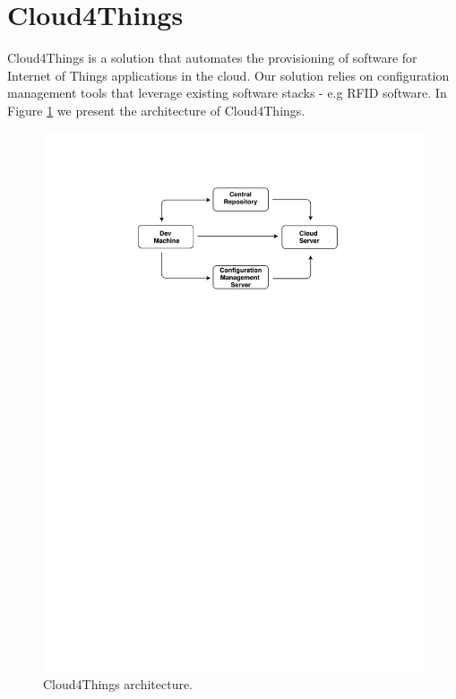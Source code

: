 \section{Cloud4Things}
\label{sec:solution}
Cloud4Things is a solution that automates the provisioning of software for Internet of Things
applications in the cloud. Our solution relies on configuration management tools that leverage
existing software stacks - e.g RFID software. In Figure \ref{fig:c4t_architecture} we present
the architecture of Cloud4Things.
\begin{figure}[!ht]
  \centering
  \includegraphics[width=\textwidth]{images/c4t-generic-solution}
  \caption{Cloud4Things architecture.}
  \label{fig:c4t_architecture}
\end{figure}


